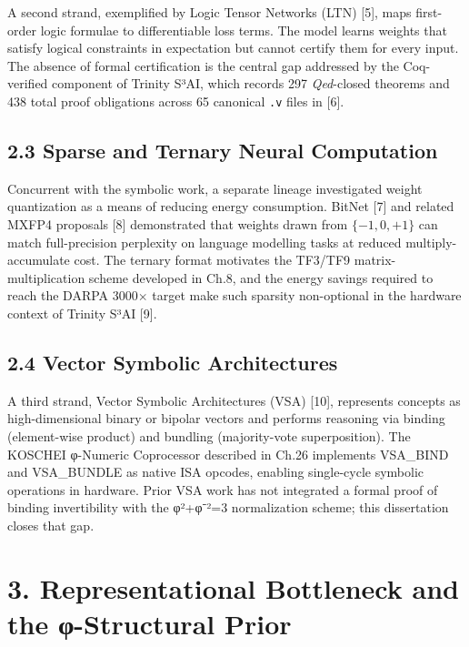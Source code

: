 A second strand, exemplified by Logic Tensor
Networks (LTN) [5], maps first-order logic
formulae to differentiable loss terms. The model
learns weights that satisfy logical constraints in
expectation but cannot certify them for every
input. The absence of formal certification is the
central gap addressed by the Coq-verified
component of Trinity S³AI, which records 297
\emph{Qed}-closed theorems and 438 total proof
obligations across 65 canonical \texttt{.v} files
in  [6].

\subsection{2.3 Sparse and Ternary Neural
Computation}\label{fa_02:sparse-and-ternary-neural-computation}

Concurrent with the symbolic work, a separate
lineage investigated weight quantization as a
means of reducing energy consumption. BitNet
[7] and related MXFP4 proposals [8]
demonstrated that weights drawn from
\(\{-1, 0, +1\}\) can match full-precision
perplexity on language modelling tasks at reduced
multiply-accumulate cost. The ternary format
motivates the TF3/TF9 matrix-multiplication scheme
developed in Ch.8, and the energy savings required
to reach the DARPA 3000$\times$ target make such sparsity
non-optional in the hardware context of Trinity
S³AI [9].

\subsection{2.4 Vector Symbolic
Architectures}\label{fa_02:vector-symbolic-architectures}

A third strand, Vector Symbolic Architectures
(VSA) [10], represents concepts as
high-dimensional binary or bipolar vectors and
performs reasoning via binding (element-wise
product) and bundling (majority-vote
superposition). The KOSCHEI φ-Numeric Coprocessor
described in Ch.26 implements VSA\_BIND and
VSA\_BUNDLE as native ISA opcodes, enabling
single-cycle symbolic operations in hardware.
Prior VSA work has not integrated a formal proof
of binding invertibility with the φ²+φ⁻²=3
normalization scheme; this dissertation closes
that gap.

\section{3. Representational Bottleneck and the
φ-Structural
Prior}\label{fa_02:representational-bottleneck-and-the-ux3c6-structural-prior}


